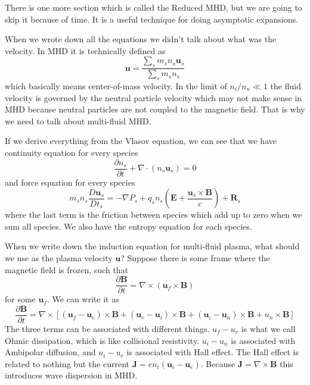 \documentclass[letterpaper, 11pt]{article}
\numberwithin{equation}{section}
\numberwithin{figure}{section}
\begin{document}
There is one more section which is called the Reduced MHD, but we are going to
skip it because of time. It is a useful technique for doing asymptotic
expansions.

When we wrote down all the equations we didn't talk about what was the velocity.
In MHD it is technically defined as
\begin{equation}
  \label{eq:16}
  \mathbf{u} = \frac{\sum_sm_sn_s\mathbf{u}_s}{\sum_sm_sn_s}
\end{equation}
which basically means center-of-mass velocity. In the limit of $n_i/n_n \ll 1$
the fluid velocity is governed by the neutral particle velocity which may not
make sense in MHD because neutral particles are not coupled to the magnetic
field. That is why we need to talk about multi-fluid MHD.

If we derive everything from the Vlasov equation, we can see that we have
continuity equation for every species
\begin{equation}
  \label{eq:17}
  \frac{\partial n_s}{\partial t} + \nabla\cdot \left( n_s\mathbf{u}_s \right) = 0
\end{equation}
and force equation for every species
\begin{equation}
  \label{eq:18}
  m_sn_s\frac{D \mathbf{u}_s}{D t_s} = -\nabla P_s + q_sn_s \left( \mathbf{E} + \frac{\mathbf{u}_s\times \mathbf{B}}{c} \right) + \mathbf{R}_s
\end{equation}
where the last term is the friction between species which add up to zero when we
sum all species. We also have the entropy equation for each species.

When we write down the induction equation for multi-fluid plasma, what should we
use as the plasma velocity $\mathbf{u}$? Suppose there is some frame where the
magnetic field is frozen, such that
\begin{equation}
  \label{eq:19}
  \frac{\partial \mathbf{B}}{\partial t} = \nabla \times \left( \mathbf{u}_f\times \mathbf{B} \right)
\end{equation}
for some $\mathbf{u}_{f}$. We can write it as
\begin{equation}
  \label{eq:20}
  \frac{\partial \mathbf{B}}{\partial t} = \nabla \times \left[ (\mathbf{u}_f - \mathbf{u}_{e}) \times \mathbf{B} + (\mathbf{u}_{e} - \mathbf{u}_{i})\times \mathbf{B} + (\mathbf{u}_{i} - \mathbf{u}_{n})\times \mathbf{B} + u_n\times \mathbf{B} \right]
\end{equation}
The three terms can be associated with different things. $u_f - u_{e}$ is what
we call Ohmic dissipation, which is like collisional resistivity. $u_i - u_n$ is
associated with Ambipolar diffusion, and $u_{i} - u_{e}$ is associated with Hall
effect. The Hall effect is related to nothing but the current $\mathbf{J} =
en_i(\mathbf{u}_{i} - \mathbf{u}_{e})$. Because $\mathbf{J} = \nabla\times
\mathbf{B}$ this introduces wave dispersion in MHD.
\end{document}
